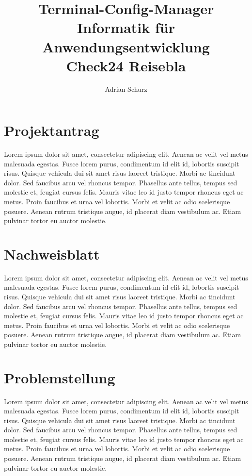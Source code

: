 \documentclass[a4paper,11pt]{scrartcl} %
\author{Adrian Schurz}
\title{Terminal-Config-Manager\\
	Informatik für Anwendungsentwicklung\\
	Check24 Reisebla\\ %
	}
\begin{document}
\maketitle
{}
\newpage

\section{Projektantrag}
\paragraph{}
Lorem ipsum dolor sit amet, consectetur adipiscing elit. Aenean ac velit vel metus malesuada egestas. Fusce lorem purus, condimentum id elit id, lobortis suscipit risus. Quisque vehicula dui sit amet risus laoreet tristique. Morbi ac tincidunt dolor. Sed faucibus arcu vel rhoncus tempor. Phasellus ante tellus, tempus sed molestie et, feugiat cursus felis. Mauris vitae leo id justo tempor rhoncus eget ac metus. Proin faucibus et urna vel lobortis. Morbi et velit ac odio scelerisque posuere. Aenean rutrum tristique augue, id placerat diam vestibulum ac. Etiam pulvinar tortor eu auctor molestie.

\section{Nachweisblatt}
\paragraph{}
Lorem ipsum dolor sit amet, consectetur adipiscing elit. Aenean ac
velit vel metus malesuada egestas. Fusce lorem purus, condimentum
id elit id, lobortis suscipit risus. Quisque vehicula dui sit amet
risus laoreet tristique. Morbi ac tincidunt dolor. Sed faucibus
arcu vel rhoncus tempor. Phasellus ante tellus, tempus sed molestie et, feugiat cursus felis. Mauris vitae leo id justo tempor rhoncus eget ac metus. Proin faucibus et urna vel lobortis. Morbi et velit ac odio scelerisque posuere. Aenean rutrum tristique augue, id placerat diam vestibulum ac. Etiam pulvinar tortor eu auctor molestie.

\newpage
\tableofcontents
\newpage


\section{Problemstellung}
\paragraph{}
Lorem ipsum dolor sit amet, consectetur adipiscing elit. Aenean ac
velit vel metus malesuada egestas. Fusce lorem purus, condimentum
id elit id, lobortis suscipit risus. Quisque vehicula dui sit amet
risus laoreet tristique. Morbi ac tincidunt dolor. Sed faucibus
arcu vel rhoncus tempor. Phasellus ante tellus, tempus sed molestie
et, feugiat cursus felis. Mauris vitae leo id justo tempor rhoncus
eget ac metus. Proin faucibus et urna vel lobortis. Morbi et velit
ac odio scelerisque posuere. Aenean rutrum tristique augue, id
placerat diam vestibulum ac. Etiam pulvinar tortor eu auctor
molestie.
\end{document}
